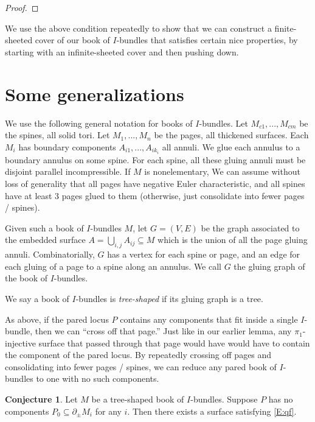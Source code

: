 \documentclass[12pt]{amsart}
\theoremstyle{definition}
\newtheorem{conj}[theorem]{Conjecture}
\theoremstyle{remark}
\newcommand{\bd}{\partial}
\newcommand{\cin}{\subseteq}
\begin{document}
{\begin{proof}
\end{proof}

We use the above condition repeatedly to show that we can construct
a finite-sheeted cover of our book of $I$-bundles that satisfies certain nice
properties, by starting with an infinite-sheeted cover and then pushing down.

\section{Some generalizations}

We use the following general notation for books of $I$-bundles. Let
$M_{c1},...,M_{cm}$ be the spines, all solid tori. Let $M_1,...,M_n$ be the
pages, all thickened surfaces. Each $M_i$ has boundary components
$A_{i1},...,A_{ik_i}$ all annuli. We glue each annulus to a boundary annulus on
some spine. For each spine, all these gluing annuli must be disjoint parallel
incompressible. If $M$ is nonelementary, We can assume without loss of
generality that all pages have negative Euler characteristic, and all spines
have at least 3 pages glued to them (otherwise, just consolidate into fewer
pages / spines).

Given such a book of $I$-bundles $M$, let $G=(V,E)$ be the graph associated to
the embedded surface $A = \bigcup_{i,j} A_{ij} \cin M$ which is the union of
all the page gluing annuli. Combinatorially, $G$ has a vertex for each spine or
page, and an edge for each gluing of a page to a spine along an annulus. We
call $G$ the gluing graph of the book of $I$-bundles.

We say a book of $I$-bundles is \emph{tree-shaped} if its gluing graph is
a tree.

As above, if the pared locus $P$ contains any components that fit inside
a single $I$-bundle, then we can ``cross off that page.'' Just like in our
earlier lemma, any $\pi_1$-injective surface that passed through that page
would have would have to contain the component of the pared locus. By
repeatedly crossing off pages and consolidating into fewer pages / spines, we
can reduce any pared book of $I$-bundles to one with no such components.

\begin{conj}

Let $M$ be a tree-shaped book of $I$-bundles. Suppose $P$ has no components
$P_0\cin \bd_\pm M_i$ for any $i$. Then there exists a surface satisfying
\eqref{E:qf}.


\end{conj}}
\end{document}
